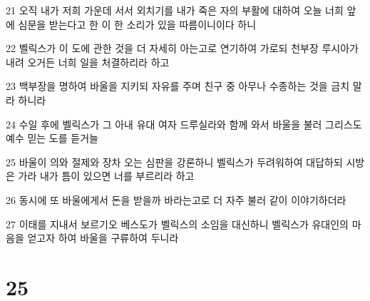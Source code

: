 \par 21 오직 내가 저희 가운데 서서 외치기를 내가 죽은 자의 부활에 대하여 오늘 너희 앞에 심문을 받는다고 한 이 한 소리가 있을 따름이니이다 하니
\par 22 벨릭스가 이 도에 관한 것을 더 자세히 아는고로 연기하여 가로되 천부장 루시아가 내려 오거든 너희 일을 처결하리라 하고
\par 23 백부장을 명하여 바울을 지키되 자유를 주며 친구 중 아무나 수종하는 것을 금치 말라 하니라
\par 24 수일 후에 벨릭스가 그 아내 유대 여자 드루실라와 함께 와서 바울을 불러 그리스도 예수 믿는 도를 듣거늘
\par 25 바울이 의와 절제와 장차 오는 심판을 강론하니 벨릭스가 두려워하여 대답하되 시방은 가라 내가 틈이 있으면 너를 부르리라 하고
\par 26 동시에 또 바울에게서 돈을 받을까 바라는고로 더 자주 불러 같이 이야기하더라
\par 27 이태를 지내서 보르기오 베스도가 벨릭스의 소임을 대신하니 벨릭스가 유대인의 마음을 얻고자 하여 바울을 구류하여 두니라

\chapter{25}

